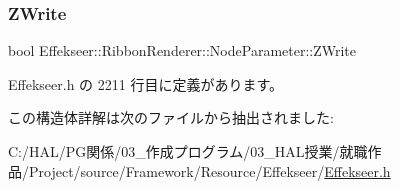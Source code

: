 \subsubsection{\texorpdfstring{Z\+Write}{ZWrite}}
{\footnotesize\ttfamily bool Effekseer\+::\+Ribbon\+Renderer\+::\+Node\+Parameter\+::\+Z\+Write}



 Effekseer.\+h の 2211 行目に定義があります。



この構造体詳解は次のファイルから抽出されました\+:\begin{DoxyCompactItemize}
\item 
C\+:/\+H\+A\+L/\+P\+G関係/03\+\_\+作成プログラム/03\+\_\+\+H\+A\+L授業/就職作品/\+Project/source/\+Framework/\+Resource/\+Effekseer/\mbox{\hyperlink{_effekseer_8h}{Effekseer.\+h}}\end{DoxyCompactItemize}
